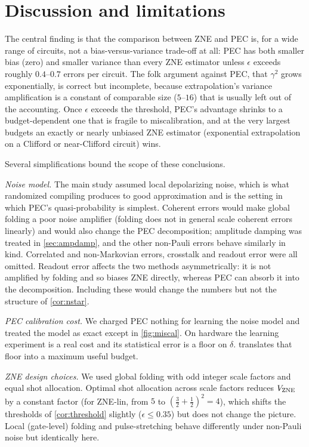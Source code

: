 \documentclass[aps,pra,reprint,amsmath,amssymb,nofootinbib,superscriptaddress]{revtex4-2}
\theoremstyle{remark}
\newcommand{\eps}{\epsilon}
\begin{document}
\section{Discussion and limitations}
\label{sec:discussion}

The central finding is that the comparison between ZNE and PEC is, for a wide range of circuits, not a bias-versus-variance trade-off at all: PEC has both smaller bias (zero) and smaller variance than every ZNE estimator unless $\eps$ exceeds roughly $0.4$--$0.7$ errors per circuit. The folk argument against PEC, that $\gamma^2$ grows exponentially, is correct but incomplete, because extrapolation's variance amplification is a constant of comparable size ($5$--$16$) that is usually left out of the accounting. Once $\eps$ exceeds the threshold, PEC's advantage shrinks to a budget-dependent one that is fragile to miscalibration, and at the very largest budgets an exactly or nearly unbiased ZNE estimator (exponential extrapolation on a Clifford or near-Clifford circuit) wins.

Several simplifications bound the scope of these conclusions.

\emph{Noise model.} The main study assumed local depolarizing noise, which is what randomized compiling produces to good approximation \cite{wallman2016} and is the setting in which PEC's quasi-probability is simplest. Coherent errors would make global folding a poor noise amplifier (folding does not in general scale coherent errors linearly) and would also change the PEC decomposition; amplitude damping was treated in \cref{sec:ampdamp}, and the other non-Pauli errors behave similarly in kind. Correlated and non-Markovian errors, crosstalk and readout error were all omitted. Readout error affects the two methods asymmetrically: it is not amplified by folding and so biases ZNE directly, whereas PEC can absorb it into the decomposition. Including these would change the numbers but not the structure of \cref{cor:nstar}.

\emph{PEC calibration cost.} We charged PEC nothing for learning the noise model and treated the model as exact except in \cref{fig:miscal}. On hardware the learning experiment is a real cost and its statistical error is a floor on $\delta$.  translates that floor into a maximum useful budget.

\emph{ZNE design choices.} We used global folding with odd integer scale factors and equal shot allocation. Optimal shot allocation across scale factors reduces $V_{\rm ZNE}$ by a constant factor (for ZNE-lin, from $5$ to $(\tfrac32+\tfrac12)^2=4$), which shifts the thresholds of \cref{cor:threshold} slightly ($\eps\le0.35$) but does not change the picture. Local (gate-level) folding and pulse-stretching behave differently under non-Pauli noise but identically here.
\end{document}
